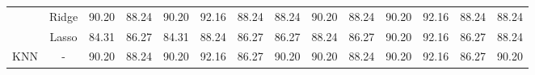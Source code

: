\begin{landscape}
\begin{table}[]
{\begin{tabular}{cc|clllllclllll}
				& Ridge                                 & 90.20                                                             & 88.24                                                                & 90.20                                                                & 92.16                                                               & 88.24                                                            & \multicolumn{1}{c|}{88.24}                                                                   & 90.20                                                             & 88.24                                                                & 90.20                                                                & 92.16                                                               & 88.24                                                            & 88.24                                                                   \\
				& Lasso                                 & 84.31                                                             & 86.27                                                                & 84.31                                                                & 88.24                                                               & 86.27                                                            & \multicolumn{1}{c|}{86.27}                                                                   & 88.24                                                             & 86.27                                                                & 90.20                                                                & 92.16                                                               & 86.27                                                            & 88.24                                                                   \\ \hline
				KNN                             & -                                     & 90.20                                                             & 88.24                                                                & 90.20                                                                & 92.16                                                               & 86.27                                                            & \multicolumn{1}{c|}{90.20}                                                                   & 90.20                                                             & 88.24                                                                & 90.20                                                                & 92.16                                                               & 86.27                                                            & 90.20                                                                   \\ \hline

\end{tabular}}
\end{table}
\end{landscape}
